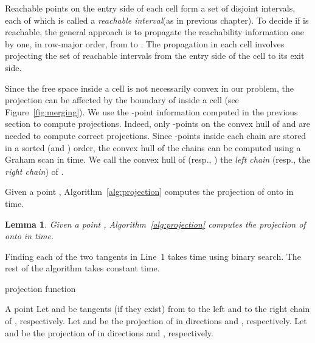 \documentclass[12pt]{dalthesis}
\def\favoritefont{\bfseries \sffamily}
\def\QED{\ensuremath{{\Box}}}
\def\markatright#1{\leavevmode\unskip\nobreak\quad\hspace*{\fill}{#1}}
\newenvironment{proof}
	{\begin{trivlist}\item[\hskip\labelsep{\favoritefont Proof:}]}
	{\markatright{\QED}\end{trivlist}}
\newtheorem{lemma}[theorem]{Lemma}
\begin{document}
Reachable points on the entry side of each cell
form a set of  disjoint intervals, 
each of which is called a \emph{reachable interval}(as in previous chapter).
To decide if   is reachable,
the general approach is to propagate the reachability information
one by one, in row-major order, 
from  to .
The propagation in each cell  involves
projecting the set of reachable intervals 
from the entry side of the cell to its exit side.


Since the free space inside a cell is not necessarily convex in our problem, the projection can be affected by the boundary of  inside a cell
(see Figure~\ref{fig:merging}). We use the -point information computed in the previous section 
to compute projections.
Indeed, only -points on the convex hull of  and  
are needed to compute correct projections. Since -points inside each chain are stored in a sorted  (and ) order,
the convex hull of the chains can be computed using a Graham scan in  time.
We call the convex hull of  (resp., )
the \emph{left chain} (resp., the \emph{right chain}) of .

Given a point , Algorithm~\ref{alg:projection} 
computes the projection of 
 onto  in  time.



\begin{lemma} \label{lemma:project-point}
	Given a point , Algorithm~\ref{alg:projection} 
	computes the projection of 
	 onto  in  time.
\end{lemma}


\begin{proof}
	Finding each of the two tangents in Line~1 takes  time using binary search.
	The rest of the algorithm takes constant time.
\end{proof}


\begin{algorithm} [h]
\caption {\sc projection function} \label{alg:projection}
\begin{algorithmic}[1]
	\vspace{0.5em}
	\baselineskip
	
	\REQUIRE A point 
	\STATE Let  and  be tangents (if they exist) from  to the left and to the right chain of , respectively.
	\STATE Let  and  be the projection of  in directions  and , respectively.	
	\STATE Let  and  be the projection of  in directions  and , respectively.
	\RETURN 
\end{algorithmic}
\end{algorithm}
\end{document}
